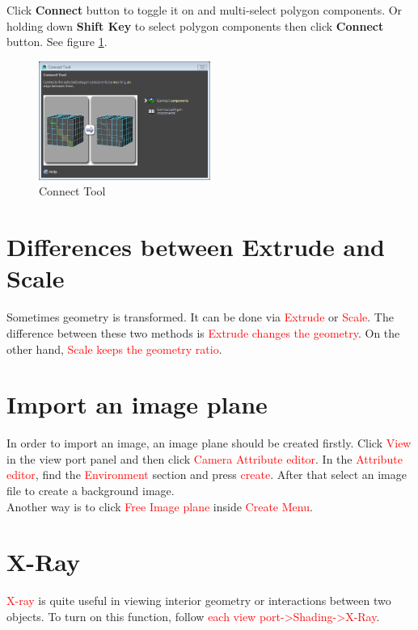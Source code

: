 Click \textbf{Connect} button to toggle it on and multi-select polygon components. Or holding down \textbf{Shift Key} to select polygon components then click \textbf{Connect} button. See figure \ref{fig: Connect Tool}.
\begin{figure}[h]
	\centering
	\includegraphics[width=0.5\textwidth]{"figures/Connect Tool"}
	\caption{Connect Tool}\label{fig: Connect Tool}
\end{figure}

\section{Differences between Extrude and Scale}
Sometimes geometry is transformed. It can be done via \textcolor{red}{Extrude} or \textcolor{red}{Scale}. The difference between these two methods is \textcolor{red}{Extrude changes the geometry}. On the other hand, \textcolor{red}{Scale keeps the geometry ratio}.

\section{Import an image plane}
In order to import an image, an image plane should be created firstly. Click \textcolor{red}{View} in the view port panel and then click \textcolor{red}{Camera Attribute editor}. In the \textcolor{red}{Attribute editor}, find the \textcolor{red}{Environment} section and press \textcolor{red}{create}. After that select an image file to create a background image.\\

Another way is to click \textcolor{red}{Free Image plane} inside \textcolor{red}{Create Menu}.

\section{X-Ray}
\textcolor{red}{X-ray} is quite useful in viewing interior geometry or interactions between two objects. To turn on this function, follow \textcolor{red}{each view port-\textgreater Shading-\textgreater X-Ray}.

